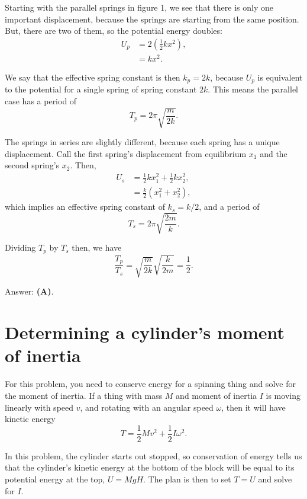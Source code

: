 \documentclass[11pt]{paper}
\newcommand{\answer}[1]{Answer: \textbf{(#1)}.}
\begin{document}
Starting with the parallel springs in figure 1, we see that there is only one important displacement, because the springs are starting from the same position.  But, there are two of them, so the potential energy doubles:
\begin{align}
	U_p &= 2\left(\frac{1}{2}kx^2\right),\\
	&=kx^2.
\end{align}

We say that the effective spring constant is then $k_p = 2k$, because $U_p$ is equivalent to the potential for a single spring of spring constant $2k$.  This means the parallel case has a period of
\begin{equation}
	T_p = 2\pi \sqrt{\frac{m}{2k}}.
\end{equation}

The springs in series are slightly different, because each spring has a unique displacement.  Call the first spring's displacement from equilibrium $x_1$ and the second spring's $x_2$.  Then,
\begin{align}
	U_s &= \frac{1}{2}kx_1^2 + \frac{1}{2}kx_2^2,\\
	&= \frac{k}{2}\left(x_1^2 + x_2^2\right),
\end{align}
which implies an effective spring constant of $k_s = k/2$, and a period of 
\begin{equation}
	T_s = 2\pi \sqrt{\frac{2m}{k}}.
\end{equation}

Dividing $T_p$ by $T_s$ then, we have
\begin{equation}
	\frac{T_p}{T_s} = \sqrt{\frac{m}{2k}}\sqrt{\frac{k}{2m}} = \frac{1}{2}.
\end{equation}

\answer{A}

\section{Determining a cylinder's moment of inertia}

For this problem, you need to conserve energy for a spinning thing and solve for the moment of inertia.  If a thing with mass $M$ and moment of inertia $I$ is moving linearly with speed $v$, and rotating with an angular speed $\omega$, then it will have kinetic energy
\begin{equation}
	T = \frac{1}{2}Mv^2 + \frac{1}{2}I\omega^2.
\end{equation}

In this problem, the cylinder starts out stopped, so conservation of energy tells us that the cylinder's kinetic energy at the bottom of the block will be equal to its potential energy at the top, $U = MgH$.  The plan is then to set $T=U$ and solve for $I$.
\end{document}

